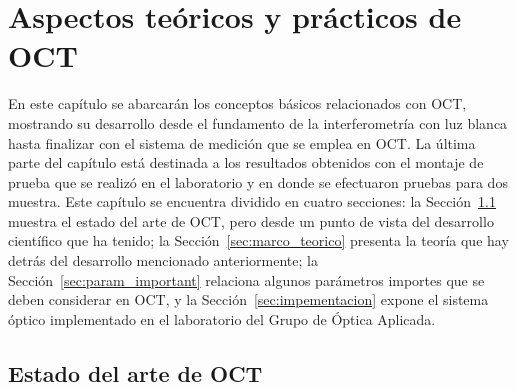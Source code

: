 \chapter{Aspectos teóricos y prácticos de OCT} \label{chapter:aspectos_teo_y_pract_oct}

En este capítulo se abarcarán los conceptos básicos relacionados con OCT, mostrando su desarrollo desde el fundamento de la interferometría con luz blanca hasta finalizar con el sistema de medición que se emplea en OCT. La última parte del capítulo está destinada a los resultados obtenidos con el montaje de prueba que se realizó en el laboratorio y en donde se efectuaron pruebas para dos muestra. Este capítulo se encuentra dividido en cuatro secciones: la Sección~\ref{sec:estado_del_arte} muestra el estado del arte de OCT, pero desde un punto de vista del desarrollo científico que ha tenido; la Sección~\ref{sec:marco_teorico} presenta la teoría que hay detrás del desarrollo mencionado anteriormente; la Sección~\ref{sec:param_important} relaciona algunos parámetros importes que se deben considerar en OCT, y la Sección~\ref{sec:impementacion} expone el sistema óptico implementado en el laboratorio del Grupo de Óptica Aplicada.

\section{Estado del arte de OCT}
\label{sec:estado_del_arte}

